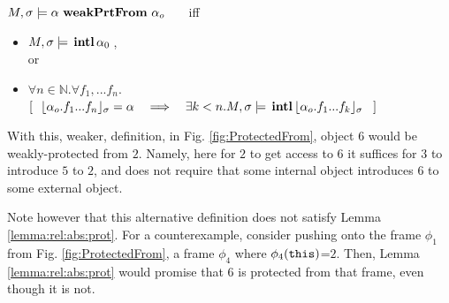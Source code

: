 $\satisfiesA{M}{\sigma}{ {\alpha\ }\textbf{weakPrtFrom}\ {\alpha_o} }$  \ \ \ iff \\
\begin{itemize}
\item $M , \sigma \models {\ensuremath{\, \mathbf{intl}}\, \alpha_0\, }$, \\ or
\item 
$\forall n\in\mathbb{N}. \forall f_1,...f_n.$\\
$
[\ \ \interpret{\sigma}{\alpha_{o}.f_1...f_n}=\alpha \ \ \  \Longrightarrow \ \ \ \exists k<n. \satisfiesA{M} {\sigma} {\internal{{\interpret{\sigma}{\alpha_{o}.f_1...f_{k}}}}}\ \ ]$
\end{itemize}


With this, weaker, definition, in Fig. \ref{fig:ProtectedFrom}, object $6$ would be weakly-protected from $2$. Namely,  here 
for $2$  to get access to $6$ it suffices for $3$ to introduce $5$ to $2$, and does not require that some internal object introduces $6$ to some external object.

Note however that this alternative definition does not satisfy Lemma \ref{lemma:rel:abs:prot}. For a counterexample,   consider pushing onto the frame $\phi_1$ from Fig. \ref{fig:ProtectedFrom}, a frame $\phi_4$ where $\phi_4({\texttt{this}})$=$2$. Then, Lemma
\ref{lemma:rel:abs:prot} would promise that $6$ is protected from that frame, even though it is not.




